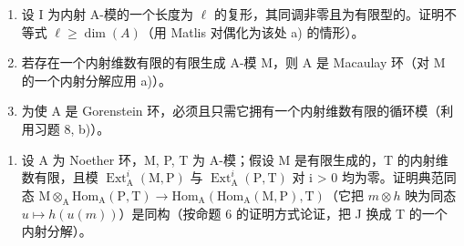 \begin{enumerate}
\def\labelenumi{\alph{enumi})}
\item
  设 I 为内射 A-模的一个长度为 \(\ell\) 的复形，其同调非零且为有限型的。证明不等式 \(\ell \geqslant \dim(A)\)（用 Matlis 对偶化为该处 a) 的情形）。
\item
  若存在一个内射维数有限的有限生成 A-模 M，则 A 是 Macaulay 环（对 M 的一个内射分解应用 a)）。
\item
  为使 A 是 Gorenstein 环，必须且只需它拥有一个内射维数有限的循环模（利用习题 8, b)）。
\end{enumerate}

\begin{enumerate}
\def\labelenumi{\arabic{enumi})}
\setcounter{enumi}{9}
\tightlist
\item
  设 A 为 Noether 环，M, P, T 为 A-模；假设 M 是有限生成的，T 的内射维数有限，且模 \(\operatorname{Ext}_{\mathrm{A}}^{i}(\mathrm{M},\mathrm{P})\) 与 \(\operatorname{Ext}_{\mathrm{A}}^{i}(\mathrm{P},\mathrm{T})\) 对 i \textgreater{} 0 均为零。证明典范同态 \(\mathrm{M}\otimes_{\mathrm{A}}\mathrm{Hom}_{\mathrm{A}}(\mathrm{P},\mathrm{T})\to\mathrm{Hom}_{\mathrm{A}}(\mathrm{Hom}_{\mathrm{A}}(\mathrm{M},\mathrm{P}),\mathrm{T})\)（它把 \(m\otimes h\) 映为同态 \(u\mapsto h(u(m))\)）是同构（按命题 6 的证明方式论证，把 J 换成 T 的一个内射分解）。
\end{enumerate}

